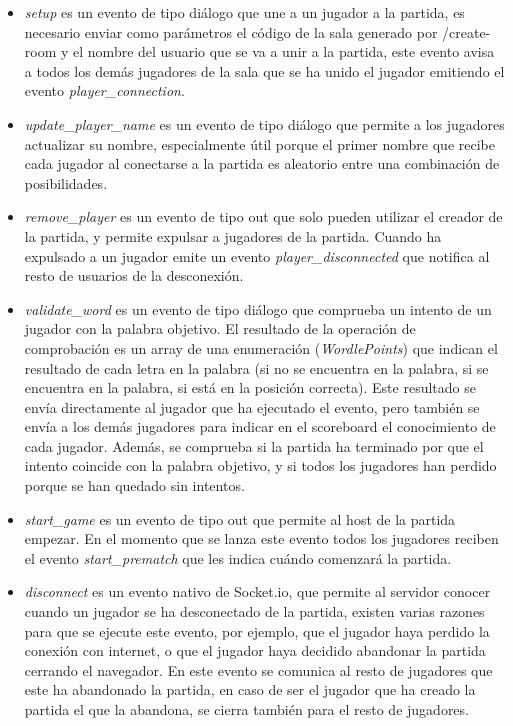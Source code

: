 \begin{itemize}
	\item \textit{setup} es un evento de tipo diálogo que une a un jugador a la partida, es necesario enviar como parámetros el código de la sala generado por /create-room y el nombre del usuario que se va a unir a la partida, este evento avisa a todos los demás jugadores de la sala que se ha unido el jugador emitiendo el evento \textit{player\_connection}.
	\item \textit{update\_player\_name} es un evento de tipo diálogo que permite a los jugadores actualizar su nombre, especialmente útil porque el primer nombre que recibe cada jugador al conectarse a la partida es aleatorio entre una combinación de posibilidades.
	\item \textit{remove\_player} es un evento de tipo out que solo pueden utilizar el creador de la partida, y permite expulsar a jugadores de la partida. Cuando ha expulsado a un jugador emite un evento \textit{player\_disconnected} que notifica al resto de usuarios de la desconexión.
	\item \textit{validate\_word} es un evento de tipo diálogo que comprueba un intento de un jugador con la palabra objetivo. El resultado de la operación de comprobación es un array de una enumeración (\textit{WordlePoints}) que indican el resultado de cada letra en la palabra (si no se encuentra en la palabra, si se encuentra en la palabra, si está en la posición correcta). Este resultado se envía directamente al jugador que ha ejecutado el evento, pero también se envía a los demás jugadores para indicar en el scoreboard el conocimiento de cada jugador. Además, se comprueba si la partida ha terminado por que el intento coincide con la palabra objetivo, y si todos los jugadores han perdido porque se han quedado sin intentos.
	\item \textit{start\_game} es un evento de tipo out que permite al host de la partida empezar. En el momento que se lanza este evento todos los jugadores reciben el evento \textit{start\_prematch} que les indica cuándo comenzará la partida.
	\item \textit{disconnect} es un evento nativo de Socket.io, que permite al servidor conocer cuando un jugador se ha desconectado de la partida, existen varias razones para que se ejecute este evento, por ejemplo, que el jugador haya perdido la conexión con internet, o que el jugador haya decidido abandonar la partida cerrando el navegador. En este evento se comunica al resto de jugadores que este ha abandonado la partida, en caso de ser el jugador que ha creado la partida el que la abandona, se cierra también para el resto de jugadores.
\end{itemize}
